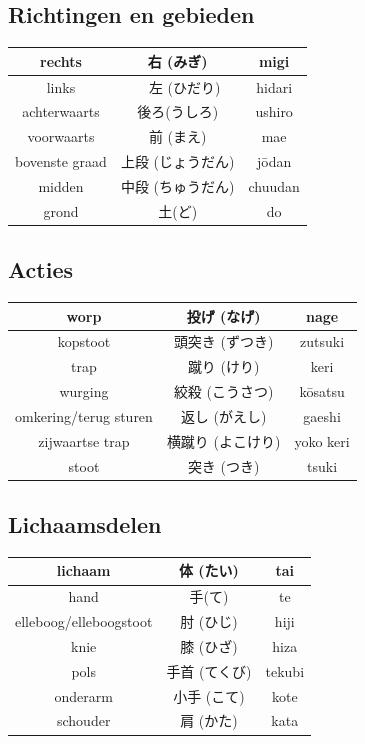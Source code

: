 \documentclass[12pt]{scrartcl}
\begin{document}
\begin{CJK*}{UTF8}{min}
\subsection{Richtingen en gebieden}
\begin{table}[H]
\begin{center}
\begin{tabular}{c|c|c}
rechts & 右 (みぎ) & migi \\
\hline
links &　左 (ひだり) & hidari\\
\hline
achterwaarts & 後ろ(うしろ) & ushiro\\
\hline
voorwaarts & 前 (まえ) & mae\\
\hline
bovenste graad & 上段 (じょうだん) & j\={o}dan\\
\hline
midden & 中段 (ちゅうだん) & chuudan\\
\hline
grond & 土(ど) & do
\end{tabular}
\end{center}
\end{table}

\subsection{Acties}
\begin{table}[H]
\begin{center}
\begin{tabular}{c|c|c}
worp & 投げ (なげ) & nage\\
\hline
kopstoot & 頭突き (ずつき) & zutsuki\\
\hline
trap & 蹴り (けり) & keri\\
\hline
wurging & 絞殺 (こうさつ) & k\={o}satsu\\
\hline
omkering/terug sturen & 返し (がえし) & gaeshi\\
\hline
zijwaartse trap & 横蹴り (よこけり) & yoko keri\\
\hline
stoot & 突き (つき) & tsuki
\end{tabular}
\end{center}
\end{table}

\subsection{Lichaamsdelen}
\begin{table}[H]
\begin{center}
\begin{tabular}{c|c|c}
lichaam & 体 (たい) & tai \\
\hline
hand & 手(て) & te \\
\hline
elleboog/elleboogstoot & 肘 (ひじ) & hiji\\
\hline
knie & 膝 (ひざ) & hiza\\
\hline
pols & 手首 (てくび) & tekubi\\
\hline
onderarm & 小手 (こて) & kote\\
\hline
schouder & 肩 (かた) & kata
\end{tabular}
\end{center}
\end{table}


\end{CJK*}
\end{document}
